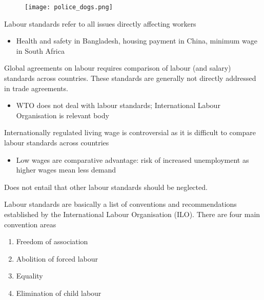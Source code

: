 \documentclass{beamer}
\begin{document}
\begin{frame}
  \begin{figure}
    \texttt{[image: police\_dogs.png]}
  \end{figure}
\end{frame}

\begin{frame}
  Labour standards refer to all issues directly affecting workers
  \begin{itemize}
    \item Health and safety in Bangladesh, housing payment in China, minimum wage in South Africa
  \end{itemize}
  \medskip
  Global agreements on labour requires comparison of labour (and salary) standards across countries.
  These standards are generally not directly addressed in trade agreements.
  \begin{itemize}
    \item WTO does not deal with labour standards; International Labour Organisation is relevant body
  \end{itemize}
\end{frame}

\begin{frame}
 Internationally regulated living wage is controversial as it is difficult to compare labour standards across countries
 \begin{itemize}
   \item Low wages are comparative advantage: risk of increased unemployment as higher wages mean less demand
 \end{itemize}
 \medskip
 Does not entail that other labour standards should be neglected.
\end{frame}

\begin{frame}
Labour standards are basically a list of conventions and recommendations established by the International Labour Organisation (ILO).
There are four main convention areas
\begin{enumerate}
  \item Freedom of association
  \item Abolition of forced labour
  \item Equality
  \item Elimination of child labour  
\end{enumerate}
\end{frame}
\end{document}
